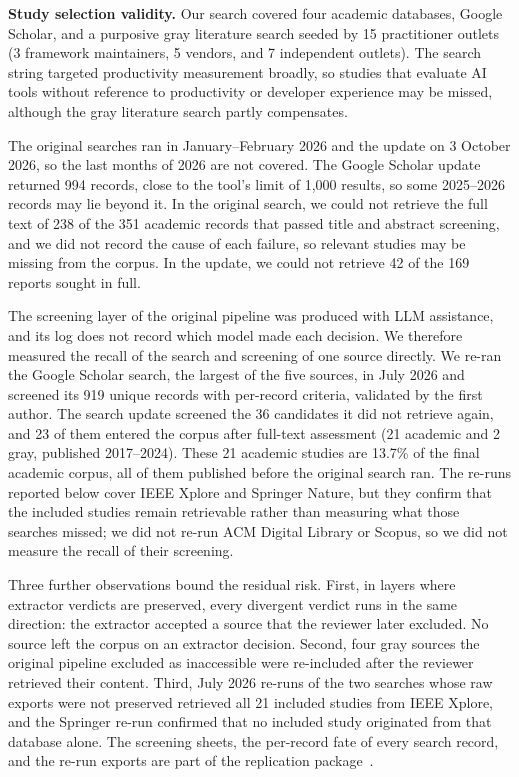 \documentclass[preprint,number]{elsarticle}
\newcounter{study}
\begin{document}
\textbf{Study selection validity.}
Our search covered four academic databases, Google Scholar, and a purposive gray literature search seeded by 15 practitioner outlets (3 framework maintainers, 5 vendors, and 7 independent outlets). The search string targeted productivity measurement broadly, so studies that evaluate AI tools without reference to productivity or developer experience may be missed, although the gray literature search partly compensates.

The original searches ran in January--February 2026 and the update on 3 October 2026, so the last months of 2026 are not covered. The Google Scholar update returned 994 records, close to the tool's limit of 1{,}000 results, so some 2025--2026 records may lie beyond it. In the original search, we could not retrieve the full text of 238 of the 351 academic records that passed title and abstract screening, and we did not record the cause of each failure, so relevant studies may be missing from the corpus. In the update, we could not retrieve 42 of the 169 reports sought in full.

The screening layer of the original pipeline was produced with LLM assistance, and its log does not record which model made each decision. We therefore measured the recall of the search and screening of one source directly. We re-ran the Google Scholar search, the largest of the five sources, in July 2026 and screened its 919 unique records with per-record criteria, validated by the first author. The search update screened the 36 candidates it did not retrieve again, and 23 of them entered the corpus after full-text assessment (21 academic and 2 gray, published 2017--2024). These 21 academic studies are 13.7\% of the final academic corpus, all of them published before the original search ran. The re-runs reported below cover IEEE Xplore and Springer Nature, but they confirm that the included studies remain retrievable rather than measuring what those searches missed; we did not re-run ACM Digital Library or Scopus, so we did not measure the recall of their screening.

Three further observations bound the residual risk. First, in layers where extractor verdicts are preserved, every divergent verdict runs in the same direction: the extractor accepted a source that the reviewer later excluded. No source left the corpus on an extractor decision. Second, four gray sources the original pipeline excluded as inaccessible were re-included after the reviewer retrieved their content. Third, July 2026 re-runs of the two searches whose raw exports were not preserved retrieved all 21 included studies from IEEE Xplore, and the Springer re-run confirmed that no included study originated from that database alone. The screening sheets, the per-record fate of every search record, and the re-run exports are part of the replication package~\cite{replication2026}.
\end{document}
